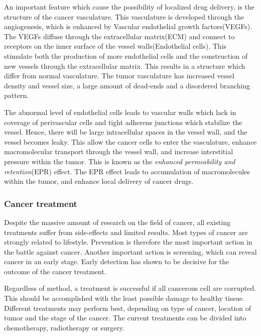 An important feature which cause the possibility of localized drug delivery, is the structure of the cancer vasculature. This vasculature is developed through the angiogenesis, which is enhanced by Vascular endothelial growth factors(VEGFs). The VEGFs diffuse through the extracellular matrix(ECM) and connect to receptors on the inner surface of the vessel walls(Endothelial cells)\cite{Koumoutsakos2013}. This stimulate both the production of more endothelial cells and the construction of new vessels through the extracellular matrix\cite{Nishida2006}. This results in a structure which differ from normal vasculature. The tumor vasculature has increased vessel density and vessel size, a large amount of dead-ends and a disordered branching pattern.    

The abnormal level of endothelial cells leads to vascular walls which lack in coverage of perivascular cells and tight adherens junctions which stabilize the vessel. Hence, there will be large intracellular spaces in the vessel wall, and the vessel becomes leaky. This allow the cancer cells to enter the vasculature, enhance macromolecular transport through the vessel wall, and increase interstitial pressure within the tumor. This is known as the \textit{enhanced permeability and retention}(EPR) effect. The EPR effect leads to accumulation of macromolecules within the tumor, and enhance local delivery of cancer drugs.



\subsubsection{Cancer treatment}
Despite the massive amount of research on the field of cancer, all existing treatments suffer from side-effects and limited results. Most types of cancer are strongly related to lifestyle. Prevention is therefore the most important action in the battle against cancer. Another important action is screening, which can reveal cancer in an early stage. Early detection has shown to be decisive for the outcome of the cancer treatment\cite{king2006cancer}\cite{Jordan1986}.

Regardless of method, a treatment is successful if all cancerous cell are corrupted. This should be accomplished with the least possible damage to healthy tissue. Different treatments may perform best, depending on type of cancer, location of tumor and the stage of the cancer. The current treatments can be divided into chemotherapy, radiotherapy or surgery.  

